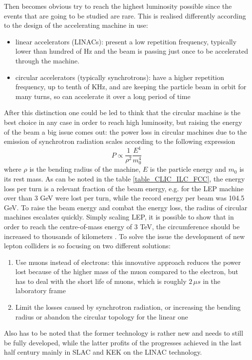 Then becomes obvious try to reach the highest luminosity possible since the events that are going to be studied are rare. This is realised differently according to the design of the accelerating machine in use:
\begin{itemize}
\item linear accelerators (LINACs): present a low repetition frequency, typically lower than hundred of Hz and the beam is passing just once to be accelerated through the machine.
\item circular accelerators (typically synchrotrons): have a higher repetition frequency, up to tenth of KHz, and are keeping the particle beam in orbit for many turns, so can accelerate it over a long period of time
\end{itemize}
After this distinction one could be led to think that the circular machine is the best choice in any case in order to reach high luminosity, but raising the energy of the beam a big issue comes out: the power loss in circular machines due to the emission of synchrotron radiation scales according to the following expression
\[
P \propto \frac{1}{\rho^2} \frac{E^4}{m_0^4}
\]
where $\rho$ is the bending radius of the machine, $E$ is the particle energy and $m_0$ is its rest mass. As can be noted in the table \ref{table_CLIC_ILC_FCC}, the energy loss per turn is a relevant fraction of the beam energy, e.g. for the LEP machine over than 3 GeV were lost per turn, while the record energy per beam was 104.5 GeV. To raise the beam energy and combat the energy loss, the radius of circular machines escalates quickly. Simply scaling LEP, it is possible to show that in order to reach the centre-of-mass energy of 3 TeV, the circumference should be increased to thousands of kilometers \cite{nature:CLIC}.
To solve the issue the development of new lepton colliders is so focusing on two different solutions:
\begin{enumerate}
\item Use muons instead of electrons: this innovative approach reduces the power lost because of the higher mass of the muon compared to the electron, but has to deal with the short life of muons, which is roughly $2 \, \mu s$ in the laboratory frame
\item Limit the losses caused by synchrotron radiation, or increasing the bending radius or abandon the circular topology for the linear one
\end{enumerate}
Also has to be noted that the former technology is rather new and needs to still be fully developed, while the latter profits of the progresses achieved in the last half century mainly in SLAC and KEK on the LINAC technology.

